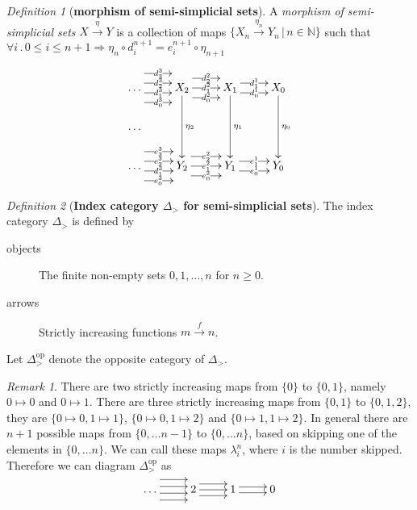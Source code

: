 \documentclass[10pt]{article}
\newcommand{\onearrow}[3]{\mbox{$#1 \stackrel{#2}{\longrightarrow} #3$}}
\theoremstyle{remark}
\newtheorem{remark}{Remark}
\newtheorem{definition}{Definition}
\begin{document}
\begin{definition}[\textbf{morphism of semi-simplicial sets}]
A \emph{morphism of semi-simplicial sets} \onearrow{X}{\eta}{Y} is a collection of maps $\{ \onearrow{X_n}{\eta_n}{Y_n} \, | \,n \in \mathbb{N} \}$ such that $\forall i \, . \, 0 \leq i \leq n+1 \Longrightarrow \eta_n \circ d_i^{n+1} = e_i^{n+1} \circ \eta_{n+1}$
\end{definition}

$$
\xymatrix{
\ldots \ar@<3ex>[r]|{d_3^3}  \ar@<1 ex>[r]|{d_2^3}  \ar@<-1ex>[r]|{d_1^3}  \ar@<-3 ex>[r]|{d_0^3} &
     X_2 \ar@<2ex>[r]|{d_2^2}  \ar[r]|{d_1^2} \ar@<-2 ex>[r]|{d_0^2} \ar[dd]^{\eta_2} &
     X_1 \ar@<1ex>[r]|{d_1^1} \ar@<-1ex>[r]|{d_0^1} \ar[dd]^{\eta_1} &
     X_0 \ar[dd]^{\eta_0} \\
\ldots     \\
  \ldots \ar@<3ex>[r]|{e_3^3}  \ar@<1 ex>[r]|{e_2^3}  \ar@<-1ex>[r]|{d_1^3}  \ar@<-3 ex>[r]|{e_0^3} &
     Y_2 \ar@<2ex>[r]|{e_2^2}  \ar[r]|{e_1^2} \ar@<-2 ex>[r]|{e_0^2} &
     Y_1 \ar@<1ex>[r]|{e_1^1} \ar@<-1ex>[r]|{e_0^1} &
     Y_0
}
$$

\begin{definition}[\textbf{Index category $\Delta_{>}$ for semi-simplicial sets}]
The index category $\Delta_{>}$ is defined by
\begin{description}
\item [objects] The finite non-empty sets ${0,1, \ldots , n}$ for $n \geq 0$.
\item [arrows] Strictly increasing functions \onearrow{m}{f}{n}.
\end{description}
Let $\Delta_{>}^{\text{op}}$ denote the opposite category of $\Delta_{>}$.
\end{definition}

\begin{remark}
There are two strictly increasing maps from $\{0\}$ to $\{0, 1\}$, namely $0 \mapsto 0$ and $0 \mapsto 1$. There are three strictly increasing maps from $\{0, 1\}$ to $\{0, 1, 2\}$, they are $\{ 0 \mapsto 0, 1 \mapsto 1\}$, $\{ 0 \mapsto 0, 1 \mapsto 2\}$ and $\{ 0 \mapsto 1, 1 \mapsto 2\}$. In general there are $n+1$ possible maps from $\{0, \ldots n-1\}$ to $\{0, \ldots n \}$, based on skipping one of the elements in $\{0, \ldots n \}$. We can call these maps $\lambda^n_i$, where $i$ is the number skipped. Therefore we can diagram $\Delta_{>}^{\text{op}}$ as
$$
\xymatrix{
\ldots \ar@<2.1ex>[r]  \ar@<0.7 ex>[r]  \ar@<-0.7ex>[r]  \ar@<-2.1 ex>[r] &
     2 \ar@<1.2ex>[r]  \ar[r] \ar@<-1.2 ex>[r] &
     1 \ar@<0.6ex>[r] \ar@<-0.6ex>[r] &
     0
}
$$
\end{remark}
\end{document}
